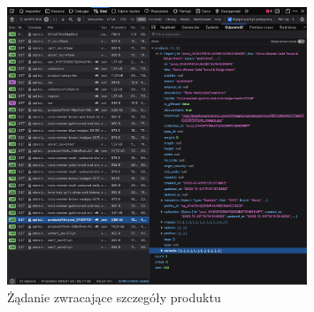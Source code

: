 \begin{figure}[H]
    \centering
    \includegraphics[width=0.8\textwidth]{img/store-get-product-details}
    \caption{Żądanie zwracające szczegóły produktu}
    \label{fig:store-get-product-details}
\end{figure}
